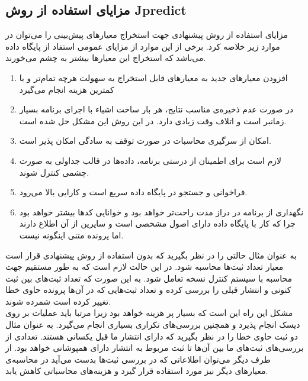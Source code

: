\subsection{مزایای استفاده از روش Jpredict}
مزایای استفاده از روش پیشنهادی جهت استخراج معیارهای پیش‌بینی را می‌توان در موارد زیر خلاصه کرد. برخی از این موارد از مزایای عمومی استفاد از پایگاه داده می‌باشد که استخراج این معیارها بیشتر به چشم می‌خورند.
\begin{enumerate}
\item افزودن معیارهای جدید به معیارهای قابل استخراج به سهولت هرچه تمام‌تر و با کمترین هزینه انجام می‌گیرد

\item	

در صورت عدم ذخیره‌ی مناسب نتایج، هر بار ساخت اشیاء با اجرای برنامه بسیار زمانبر است و اتلاف وقت زیادی دارد. در این روش این مشکل حل شده است.
\item 
امکان از سرگیری محاسبات در صورت توقف به سادگی امکان پذیر است.

\item
لازم است برای اطمینان از درستی برنامه، داده‌ها در قالب جداولی به صورت چشمی کنترل شوند.
\item
فراخوانی و جستجو در پایگاه داده سریع است و کارایی بالا می‌رود.
\item
نگهداری از برنامه در دراز مدت راحت‌تر خواهد بود و خوانایی کدها بیشتر خواهد بود چرا که کار با پایگاه داده دارای اصول مشخصی است و سایرین از آن اطلاع دارند اما پرونده متنی اینگونه نیست.
\end{enumerate}

به عنوان مثال حالتی را در نظر بگیرید که  بدون استفاده از روش پیشنهادی  قرار است معیار تعداد ثبت‌ها محاسبه شود. در این حالت لازم است که به طور مستقیم جهت محاسبه با سیستم کنترل نسخه تعامل شود.  به این صورت که تعداد ثبت‌های بین ثبت کنونی و انتشار قبلی  را بررسی کرده و تعداد  ثبت‌هایی که در آن‌ها پرونده حاوی خطا تغییر کرده است شمرده شوند.\\ مشکل این راه این است که بسیار پر هزینه  خواهد بود زیرا مرتبا باید عملیات  بر روی دیسک انجام پذیرد و همچنین بررسی‌های تکراری بسیاری انجام می‌گیرد. به عنوان مثال دو ثبت حاوی خطا را در نظر بگیرید که دارای انتشار ما قبل یکسانی هستند. تعدادی از بررسی‌های ثبت‌های ما بین آن‌ها تا ثبت مربوط به انتشار دارای همپوشانی خواهد بود. از طرف دیگر می‌توان اطلاعاتی که در بررسی ثبت‌ها بدست می‌آید در محاسبه‌ی معیارهای دیگر نیز مورد استفاده قرار گیرد و هزینه‌های محاسباتی کاهش یابد. 

